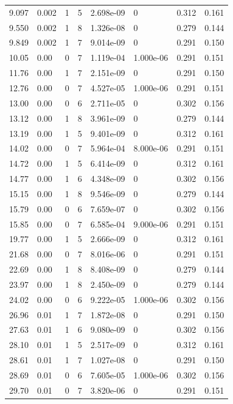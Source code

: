\documentclass[preview]{standalone}
\begin{document}
{{\begin{tabular}{L{1.2cm}C{1.2cm} C{0.3cm}C{0.5cm} C{1.4cm}C{1.4cm} C{1.4cm}C{1.4cm}}
  9.097  &  0.002  & 1     &  5 &  2.698e-09  & 0  & 0.312 &  0.161   \\ 
  9.550  &  0.002  & 1     &  8 &  1.326e-08  & 0  & 0.279 &  0.144   \\ 
  9.849  &  0.002  & 1     &  7 &  9.014e-09  & 0  & 0.291 &  0.150   \\ 
  10.05  &  0.00  & 0     &  7 &  1.119e-04  & 1.000e-06  & 0.291 &  0.151   \\ 
  11.76  &  0.00  & 1     &  7 &  2.151e-09  & 0  & 0.291 &  0.150   \\ 
  12.76  &  0.00  & 0     &  7 &  4.527e-05  & 1.000e-06  & 0.291 &  0.151   \\ 
  13.00  &  0.00  & 0     &  6 &  2.711e-05  & 0  & 0.302 &  0.156   \\ 
  13.12  &  0.00  & 1     &  8 &  3.961e-09  & 0  & 0.279 &  0.144   \\ 
  13.19  &  0.00  & 1     &  5 &  9.401e-09  & 0  & 0.312 &  0.161   \\ 
  14.02  &  0.00  & 0     &  7 &  5.964e-04  & 8.000e-06  & 0.291 &  0.151   \\ 
  14.72  &  0.00  & 1     &  5 &  6.414e-09  & 0  & 0.312 &  0.161   \\ 
  14.77  &  0.00  & 1     &  6 &  4.348e-09  & 0  & 0.302 &  0.156   \\ 
  15.15  &  0.00  & 1     &  8 &  9.546e-09  & 0  & 0.279 &  0.144   \\ 
  15.79  &  0.00  & 0     &  6 &  7.659e-07  & 0  & 0.302 &  0.156   \\ 
  15.85  &  0.00  & 0     &  7 &  6.585e-04  & 9.000e-06  & 0.291 &  0.151   \\ 
  19.77  &  0.00  & 1     &  5 &  2.666e-09  & 0  & 0.312 &  0.161   \\ 
  21.68  &  0.00  & 0     &  7 &  8.016e-06  & 0  & 0.291 &  0.151   \\ 
  22.69  &  0.00  & 1     &  8 &  8.408e-09  & 0  & 0.279 &  0.144   \\ 
  23.97  &  0.00  & 1     &  8 &  2.450e-09  & 0  & 0.279 &  0.144   \\ 
  24.02  &  0.00  & 0     &  6 &  9.222e-05  & 1.000e-06  & 0.302 &  0.156   \\ 
  26.96  &  0.01  & 1     &  7 &  1.872e-08  & 0  & 0.291 &  0.150   \\ 
  27.63  &  0.01  & 1     &  6 &  9.080e-09  & 0  & 0.302 &  0.156   \\ 
  28.10  &  0.01  & 1     &  5 &  2.517e-09  & 0  & 0.312 &  0.161   \\ 
  28.61  &  0.01  & 1     &  7 &  1.027e-08  & 0  & 0.291 &  0.150   \\ 
  28.69  &  0.01  & 0     &  6 &  7.605e-05  & 1.000e-06  & 0.302 &  0.156   \\ 
  29.70  &  0.01  & 0     &  7 &  3.820e-06  & 0  & 0.291 &  0.151   \\ 
\hline 
\end{tabular} 

}}
\end{document}

